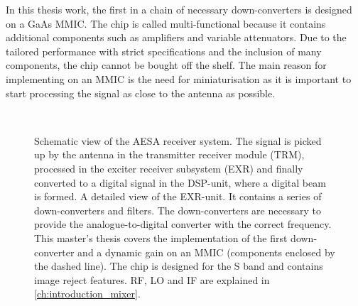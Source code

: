 		In this thesis work, the first in a chain of necessary down-converters is designed on a GaAs MMIC. The chip is called multi-functional because it contains additional components such as amplifiers and variable attenuators. Due to the tailored performance with strict specifications and the inclusion of many components, the chip cannot be bought off the shelf. The main reason for implementing on an MMIC is the need for miniaturisation as it is important to start processing the signal as close to the antenna as possible.

		\begin{figure}[hpt!]
			\centering
			\\
			\caption[AESA receiver system.]{Schematic view of the AESA receiver system.  The signal is picked up by the antenna in the transmitter receiver module (TRM), processed in the exciter receiver subsystem (EXR) and finally converted to a digital signal in the DSP-unit, where a digital beam is formed.  A detailed view of the EXR-unit. It contains a series of down-converters and filters. The down-converters are necessary to provide the analogue-to-digital converter with the correct frequency. This master's thesis covers the implementation of the first down-converter and a dynamic gain on an MMIC (components enclosed by the dashed line). The chip is designed for the S band and contains image reject features. RF, LO and IF are explained in  \ref{ch:introduction_mixer}.}\label{fig:intro_fig}
		\end{figure}


